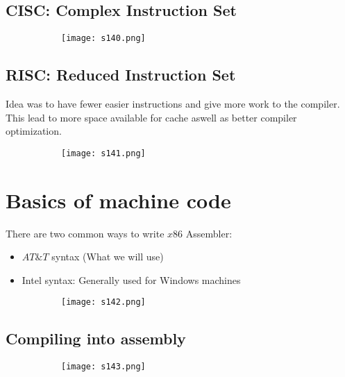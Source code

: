 \documentclass[8pt]{extreport}
\begin{document}
\subsection{CISC: Complex Instruction Set}
\begin{figure}[H]
\centering
\begin{subfigure}[b]{0.4\linewidth}
\texttt{[image: s140.png]}
\end{subfigure}
\end{figure}

\subsection{RISC: Reduced Instruction Set}
Idea was to have fewer easier instructions and give more work to the compiler. This lead to more space available for cache aswell as better compiler optimization.
\begin{figure}[H]
\centering
\begin{subfigure}[b]{0.4\linewidth}
\texttt{[image: s141.png]}
\end{subfigure}
\end{figure}

\section{Basics of machine code}

There are two common ways to write $x86$ Assembler:
\begin{itemize}
\item $AT\&T$ syntax (What we will use)
\item Intel syntax: Generally used for Windows machines
\end{itemize}
\begin{figure}[H]
\centering
\begin{subfigure}[b]{0.4\linewidth}
\texttt{[image: s142.png]}
\end{subfigure}
\end{figure}
\subsection{Compiling into assembly}
\begin{figure}[H]
\centering
\begin{subfigure}[b]{0.4\linewidth}
\texttt{[image: s143.png]}
\end{subfigure}
\end{figure}
\end{document}
